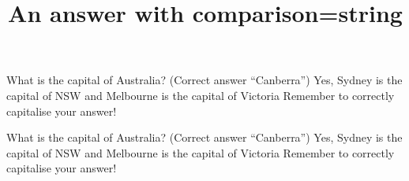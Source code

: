 \documentclass[hidesidemenu]{webquiz}
\title{An answer with comparison=string}
\begin{document}
  \begin{question}     %
     What is the capital of Australia?
      (Correct answer ``Canberra'')
     \whenRight  Yes, Sydney is the capital of NSW and Melbourne is the
     capital of Victoria
     \whenWrong Remember to correctly capitalise your answer!
  \end{question}
  \begin{question}     %
     What is the capital of Australia?
      (Correct answer ``Canberra'')
     \whenRight  Yes, Sydney is the capital of NSW and Melbourne is the
     capital of Victoria
     \whenWrong Remember to correctly capitalise your answer!
  \end{question}
\end{document}
